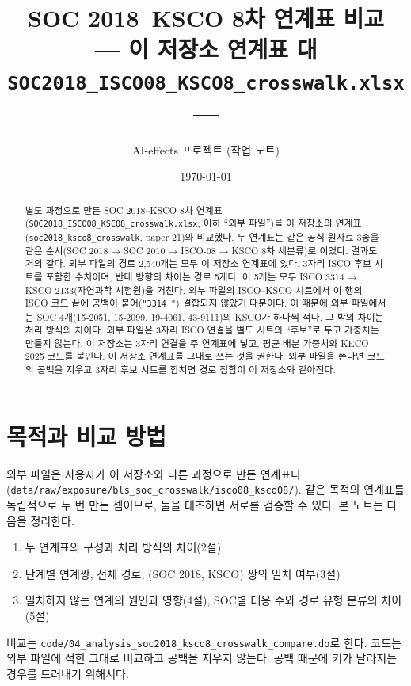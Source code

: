 \documentclass[11pt]{article}
\title{SOC 2018–KSCO 8차 연계표 비교\\[2mm]
\large --- 이 저장소 연계표 대 \texttt{SOC2018\_ISCO08\_KSCO8\_crosswalk.xlsx} ---}
\author{AI-effects 프로젝트 (작업 노트)}
\date{\today}
\begin{document}
\maketitle

\begin{abstract}
\noindent 별도 과정으로 만든 SOC 2018–KSCO 8차 연계표(\texttt{SOC2018\_ISCO08\_KSCO8\_crosswalk.xlsx}, 이하 ``외부 파일'')를 이 저장소의 연계표(\texttt{soc2018\_ksco8\_crosswalk}, paper 21)와 비교했다. 두 연계표는 같은 공식 원자료 3종을 같은 순서(SOC 2018 → SOC 2010 → ISCO-08 → KSCO 8차 세분류)로 이었다. 결과도 거의 같다. 외부 파일의 경로 2,540개는 모두 이 저장소 연계표에 있다. 3자리 ISCO 후보 시트를 포함한 수치이며, 반대 방향의 차이는 경로 5개다. 이 5개는 모두 ISCO 3314 → KSCO 2133(자연과학 시험원)을 거친다. 외부 파일의 ISCO–KSCO 시트에서 이 행의 ISCO 코드 끝에 공백이 붙어(\texttt{"3314 "}) 결합되지 않았기 때문이다. 이 때문에 외부 파일에서는 SOC 4개(15-2051, 15-2099, 19-4061, 43-9111)의 KSCO가 하나씩 적다. 그 밖의 차이는 처리 방식의 차이다. 외부 파일은 3자리 ISCO 연결을 별도 시트의 ``후보''로 두고 가중치는 만들지 않는다. 이 저장소는 3자리 연결을 주 연계표에 넣고, 평균$\cdot$배분 가중치와 KECO 2025 코드를 붙인다. 이 저장소 연계표를 그대로 쓰는 것을 권한다. 외부 파일을 쓴다면 코드의 공백을 지우고 3자리 후보 시트를 합치면 경로 집합이 이 저장소와 같아진다.
\end{abstract}

\section{목적과 비교 방법}

외부 파일은 사용자가 이 저장소와 다른 과정으로 만든 연계표다(\texttt{data/raw/exposure/bls\_soc\_crosswalk/isco08\_ksco08/}). 같은 목적의 연계표를 독립적으로 두 번 만든 셈이므로, 둘을 대조하면 서로를 검증할 수 있다. 본 노트는 다음을 정리한다.
\begin{enumerate}[leftmargin=*]
  \item 두 연계표의 구성과 처리 방식의 차이(2절)
  \item 단계별 연계쌍, 전체 경로, (SOC 2018, KSCO) 쌍의 일치 여부(3절)
  \item 일치하지 않는 연계의 원인과 영향(4절), SOC별 대응 수와 경로 유형 분류의 차이(5절)
\end{enumerate}
비교는 \texttt{code/04\_analysis\_soc2018\_ksco8\_crosswalk\_compare.do}로 한다. 코드는 외부 파일에 적힌 그대로 비교하고 공백을 지우지 않는다. 공백 때문에 키가 달라지는 경우를 드러내기 위해서다.
\end{document}
